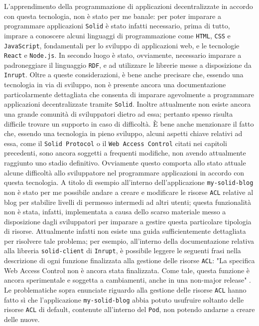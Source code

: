 L'apprendimento della programmazione di applicazioni decentralizzate in accordo con questa tecnologia, non è stato per me banale: per poter imparare a programmare applicazioni {\tt Solid} è stato infatti necessario, prima di tutto, imprare a conoscere alcuni linguaggi di programmazione come {\tt HTML}, {\tt CSS} e {\tt JavaScript}, fondamentali per lo sviluppo di applicazioni web, e le tecnologie {\tt React} e {\tt Node.js}. In secondo luogo è stato, ovviamente, necessario imparare a padroneggiare il linguaggio {\tt RDF}, e ad utilizzare le librerie messe a disposizione da {\tt Inrupt}. Oltre a queste considerazioni, è bene anche precisare che, essendo una tecnologia in via di sviluppo, non è presente ancora una documentazione particolarmente dettagliata che consenta di imparare agevolmente a programmare applicazioni decentralizzate tramite {\tt Solid}. Inoltre attualmente non esiste ancora una grande comunità di sviluppatori dietro ad essa; pertanto spesso risulta difficile trovare un supporto in caso di difficoltà. È bene anche menzionare il fatto che, essendo una tecnologia in pieno sviluppo, alcuni aspetti chiave relativi ad essa, come il {\tt Solid Protocol} o il {\tt Web Access Control} citati nei capitoli precedenti, sono ancora soggetti a frequenti modifiche, non avendo attualmente raggiunto uno stadio definitivo. Ovviamente questo comporta allo stato attuale alcune difficoltà allo sviluppatore nel programmare applicazioni in accordo con questa tecnologia. A titolo di esempio all'interno dell'applicazione {\tt my-solid-blog} non è stato per me possibile andare a creare e modificare le risorse {\tt ACL} relative al blog per stabilire livelli di permesso intermedi ad altri utenti; questa funzionalità non è stata, infatti, implementata a causa dello scarso materiale messo a disposizione dagli sviluppatori per imparare a gestire questa particolare tipologia di risorse. Attualmente infatti non esiste una guida sufficientemente dettagliata per risolvere tale problema; per esempio, all'interno della documentazione relativa alla libreria {\tt solid-client} di {\tt Inrupt}, è possibile leggere le seguenti frasi nella descrizione di ogni funzione finalizzata alla gestione delle risorse {\tt ACL}: "La specifica Web Access Control non è ancora stata finalizzata. Come tale, questa funzione è ancora sperimentale e soggetta a cambiamenti, anche in una non-major release" \cite{inruptdoc}. Le problematiche sopra enunciate riguardo alla gestione delle risorse {\tt ACL} hanno fatto sì che l'applicazione {\tt my-solid-blog} abbia potuto usufruire soltanto delle risorse {\tt ACL} di default, contenute all'interno del {\tt Pod}, non potendo andarne a creare delle nuove.

